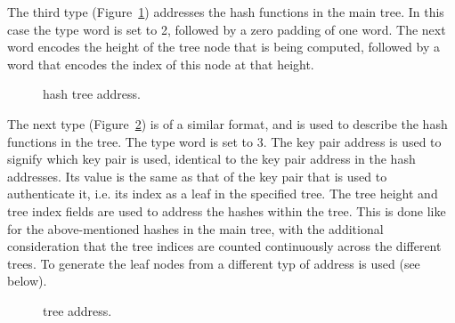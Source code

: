    The third type (Figure~\ref{fig:adrs:hashtree}) addresses the hash functions in the main tree.
   In this case the type word is set to 2, followed by a zero padding
   of one word.  The next word encodes the height of the tree node
   that is being computed, followed by a word that encodes the
   index of this node at that height.

\begin{figure}[h]
  \centering
  \caption{hash tree address.}
  \label{fig:adrs:hashtree}
\end{figure}


   The next type (Figure~\ref{fig:adrs:forstree}) is of a similar format, and is used to describe the hash functions
   in the \fors tree.  The type word is set to 3.  The key pair address is used to signify which \fors key pair is used,
   identical to the key pair address in the \wotsp hash addresses.
   Its value is the same as that of the \wotsp key pair that is used to authenticate it,
   i.e. its index as a leaf in the specified tree.
   The tree height and tree index fields are used to address the hashes within the \fors tree.
   This is done like for the above-mentioned hashes in the main tree,
   with the additional consideration that the tree indices are counted
   continuously across the different \fors trees.
   To generate the leaf nodes from \sseed a different typ of address is used (see below).

\begin{figure}[h]
  \centering
  \caption{\fors tree address.}
  \label{fig:adrs:forstree}
\end{figure}


